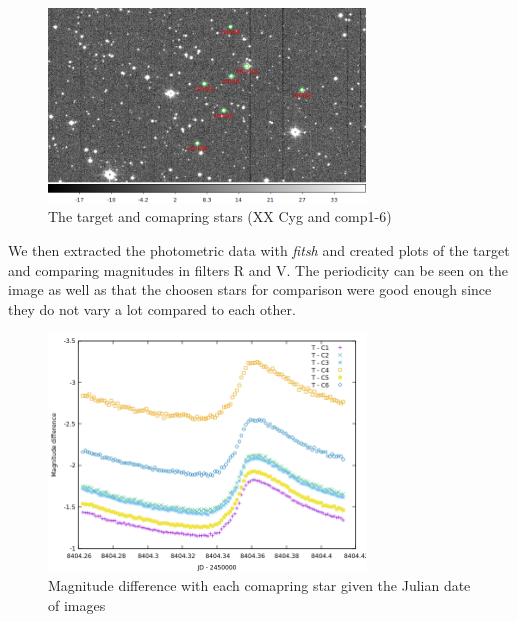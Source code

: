 \documentclass[a4paper,12pt]{article}
\begin{document}
\begin{figure}[H]
    \centering
    \includegraphics[width=0.75\textwidth]{../PSCH-20181012/psch/20181012/withStars.png}
    \caption{The target and comapring stars (XX Cyg and comp1-6)}
    \label{fig:jd}
\end{figure}

\par We then extracted the photometric data with \textit{fitsh} and created plots
of the target and comparing magnitudes in filters R and V. The periodicity can be seen
on the image as well as that the choosen stars for comparison were good enough since 
they do not vary a lot compared to each other.

\begin{figure}[H]
    \centering
    \includegraphics[width=0.75\textwidth]{../PSCH-20181012/psch/20181012/mag-jd.png}
    \caption{Magnitude difference with each comapring star given the Julian date of images}
\end{figure}
\end{document}
